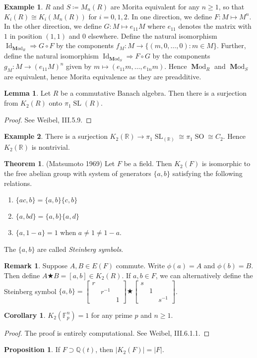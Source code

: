 \documentclass[10pt,letterpaper,cm]{nupset}
\theoremstyle{definition}
\newtheorem{exmp}{Example}
\newtheorem{remark}{Remark}
\newtheorem{theorem}{Theorem}
\newtheorem{corollary}{Corollary}
\newtheorem{lemma}{Lemma}
\newtheorem{prop}{Proposition}
\newcommand{\F}{\mathbb F}
\newcommand{\Q}{\mathbb Q}
\newcommand{\R}{\mathbb R}
\newcommand{\1}{\mathbf{1}}
\newcommand{\0}{\vec 0}
\DeclareMathOperator*{\SL}{SL}
\DeclareMathOperator*{\SO}{SO}
\DeclareMathOperator{\id}{Id}
\DeclareMathOperator{\Mod}{\mathbf Mod}
\begin{document}
\begin{exmp}
$R$ and $S\coloneqq M_n(R)$ are Morita equivalent for any $n\geq 1$, so that $K_i(R) \cong K_i(M_n(R))$ for $i=0, 1, 2$. In one direction, we define $F: M \mapsto M^n$. In the other direction, we define $G: M \mapsto e_{11}M$ where $e_11$ denotes the matrix with $1$ in position $(1, 1)$ and $0$ elsewhere. Define the natural isomorphism $\id_{\Mod_R} \Rightarrow G\circ F$ by the components $f_M : M \to \{(m, 0, \ldots, 0) : m \in M\}$. Further, define the natural isomorphism $\id_{\Mod_S} \Rightarrow F\circ G$ by the components  $g_M : M \to (e_{11}M)^n$ given by $m\mapsto (e_{11}m, \ldots, e_{1n}m)$. Hence $\Mod_R$ and $\Mod_S$ are equivalent, hence Morita equivalence as they are preadditive.
\end{exmp}

\begin{lemma}
Let $R$ be a commutative Banach algebra. Then there is a surjection from $K_2(R)$ onto $\pi_1\SL(R)$. 
\end{lemma}
\begin{proof}
See Weibel, III.5.9.
\end{proof}

\begin{exmp}
There is a surjection $K_2(\R) \to \pi_1 \SL_(\R) \cong \pi_1\SO \cong C_2$. Hence $K_2(\R)$ is nontrivial.
\end{exmp}

\begin{theorem}{(Matsumoto 1969)}
Let $F$ be a field. Then $K_2(F)$ is isomorphic to the free abelian group with system of generators $\{a, b\}$  satisfying the following relations.
\begin{enumerate}
\item $\{ac, b\} = \{a, b\}\{c, b\}$
\item $\{a, bd\} = \{a, b\}\{a, d\}$
\item $\{a, 1-a\}=1$ when $a \ne 1 \ne 1-a$.
\end{enumerate}
The $\{a,b\}$ are called \textit{Steinberg symbols}.
\end{theorem}
\begin{remark}
Suppose $A, B \in E(F)$ commute. Write $\phi(a) =A$ and $\phi(b) = B$. Then define $A \bigstar B =[a,b] \in K_2(R)$. If $a,b\in F$, we can alternatively define the Steinberg symbol $\{a, b\} = \begin{bmatrix}
    r & & \\
    & r^{-1} & \\
    & & 1
  \end{bmatrix}
 \bigstar
  \begin{bmatrix}
    s & & \\
    & 1 & \\
    & & s^{-1}
  \end{bmatrix}
 $. 
\end{remark}

\begin{corollary}
$K_2(\F_p^n) =1$ for any prime $p$ and $n\geq 1$.
\end{corollary}
\begin{proof}
The proof is entirely computational. See Weibel, III.6.1.1.
\end{proof}

\begin{prop}
If $F \supset \Q(t)$, then $|K_2(F)| = |F|$.
\end{prop}
\end{document}
